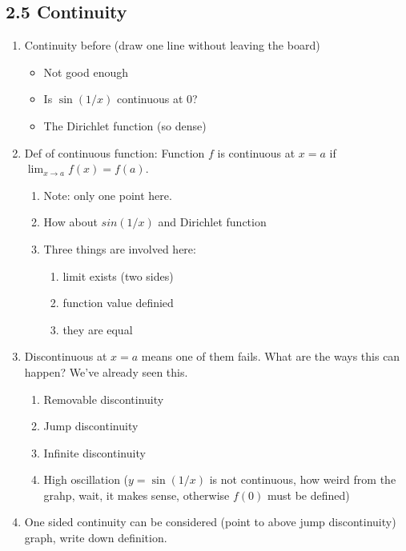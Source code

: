 \documentclass{article}
\begin{document}
\subsection{2.5 Continuity}
\begin{enumerate}

\item Continuity before (draw one line without leaving the board)
\begin{itemize}
\item Not good enough
\item Is $\sin(1/x)$ continuous at 0?
\item The Dirichlet function (so dense)
\end{itemize}

\item Def of continuous function: Function $f$ is continuous at $x=a$ if $\lim_{x\rightarrow a} f(x) = f(a)$.
\begin{enumerate}
\item Note: only one point here.
\item How about $sin(1/x)$ and Dirichlet function
\item Three things are involved here:
\begin{enumerate}
\item limit exists (two sides)
\item function value definied
\item they are equal
\end{enumerate}
\end{enumerate}

\item Discontinuous at $x=a$ means one of them fails. What are the ways this can happen? We've already seen this.
\begin{enumerate}
\item Removable discontinuity
\item Jump discontinuity
\item Infinite discontinuity
\item High oscillation ($y = \sin(1/x)$ is not continuous, how weird from the grahp, wait, it makes sense, otherwise $f(0)$ must be defined)
\end{enumerate}

\item One sided continuity can be considered (point to above jump discontinuity) graph, write down definition.


\end{enumerate}
\end{document}
